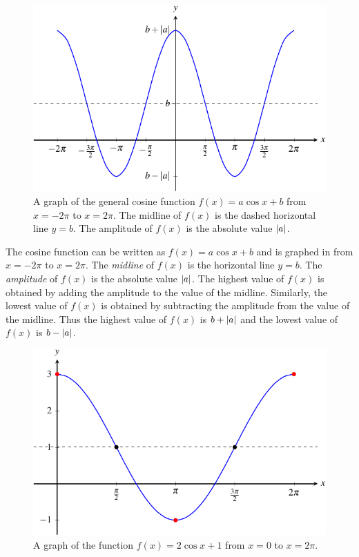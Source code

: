 \documentclass[a4paper,oneside,12pt]{article}
\begin{document}
\begin{figure}[!htbp]
\centering
\includegraphics[scale=1.1]{image/13/a-cos-b.pdf}
\caption{%
  A graph of the general cosine function $f(x) = a \cos x + b$ from
  $x = -2\pi$ to $x = 2\pi$.  The midline of $f(x)$ is the dashed
  horizontal line $y = b$.  The amplitude of $f(x)$ is the absolute
  value $\lvert a\rvert$.
}
\label{fig:trigonometric:a_cos_b}
\end{figure}

The cosine function can be written as $f(x) = a \cos x + b$ and is
graphed in  from $x = -2\pi$ to
$x = 2\pi$.  The \emph{midline} of $f(x)$ is the horizontal line
$y = b$.  The \emph{amplitude} of $f(x)$ is the absolute value
$\lvert a\rvert$.  The highest value of $f(x)$ is obtained by
adding the amplitude to the value of the midline.  Similarly, the
lowest value of $f(x)$ is obtained by subtracting the amplitude from
the value of the midline. Thus the highest value of $f(x)$ is
$b + \lvert a\rvert$ and the lowest value of $f(x)$ is
$b - \lvert a\rvert$.

\begin{figure}[!htbp]
\centering
\includegraphics[scale=1.1]{image/13/2-cos-3.pdf}
\caption{%
  A graph of the function $f(x) = 2 \cos x + 1$ from $x = 0$ to
  $x = 2\pi$.
}
\label{fig:trigonometric:2_cos_1}
\end{figure}
\end{document}

